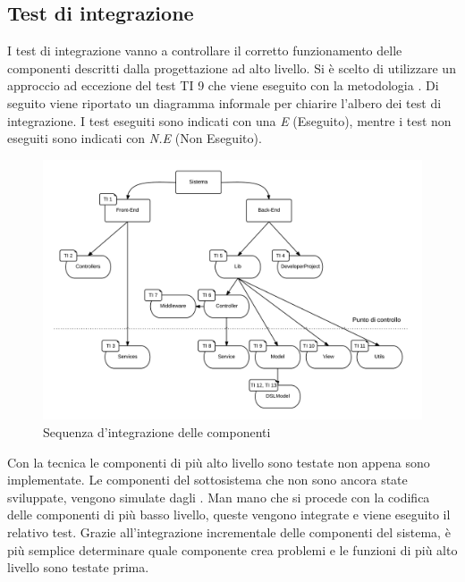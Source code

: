 	
	
	
	\subsection{Test di integrazione}
	I test di integrazione vanno a controllare il corretto funzionamento delle componenti descritti dalla progettazione ad alto livello. Si è scelto di utilizzare un approccio  ad eccezione del test TI 9 che viene eseguito con la metodologia . Di seguito viene riportato un diagramma informale per chiarire l'albero dei test di integrazione. I test eseguiti sono indicati con una \emph{E} (Eseguito), mentre i test non eseguiti sono indicati con \emph{N.E} (Non Eseguito).

	\begin{figure}[H]
	\centering \includegraphics[width=1\textwidth]{sequenza-di-integrazione.png}
	\caption{Sequenza d'integrazione delle componenti}
	\label{fig:sequenza-di-integrazione}
	\end{figure}

	Con la tecnica  le componenti di più alto livello sono testate non appena sono implementate. Le componenti del sottosistema che non sono ancora state sviluppate, vengono simulate dagli . Man mano che si procede con la codifica delle componenti di più basso livello, queste vengono integrate e viene eseguito il relativo test. Grazie all'integrazione incrementale delle componenti del sistema, è più semplice determinare quale componente crea problemi e le funzioni di più alto livello sono testate prima.


